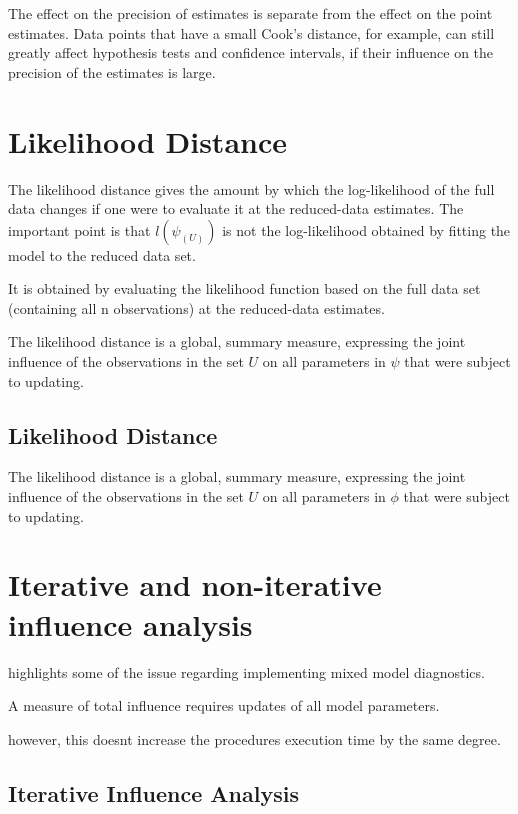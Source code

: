 \documentclass[12pt, a4paper]{report}
\theoremstyle{plain}
\theoremstyle{definition}
\theoremstyle{remark}
\begin{document}
The effect on the precision of estimates is separate from the effect on the point estimates. Data points that
have a small Cook's distance, for example, can still greatly affect hypothesis tests and confidence intervals, if their  influence on the precision of the estimates is large.


\newpage
\section{Likelihood Distance} %
The likelihood distance gives the amount by which the log-likelihood of the full data changes if one were
to evaluate it at the reduced-data estimates. The important point is that $l(\psi_{(U)})$ is not the log-likelihood
obtained by fitting the model to the reduced data set.

It is obtained by evaluating the likelihood function based on the full data set (containing all n observations) at the reduced-data estimates.

The likelihood distance is a global, summary measure, expressing the joint influence of the observations in
the set $U$ on all parameters in $\psi$  that were subject to updating.

\subsection{Likelihood Distance}

The  likelihood distance is a global, summary measure, expressing the joint influence of the observations in the set $U$ on all parameters in $\phi$  that were subject to updating.




\newpage
\section{Iterative and non-iterative influence analysis} %
\citet{schabenberger} highlights some of the issue regarding implementing mixed model diagnostics.

A measure of total influence requires updates of all model parameters.

however, this doesnt increase the procedures execution time by the same degree.
\subsection{Iterative Influence Analysis}
\end{document}

